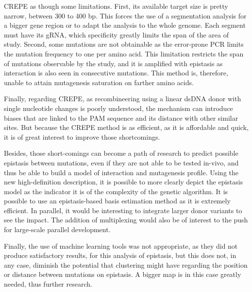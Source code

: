 \documentclass[12pt]{article}
\begin{document}
  CREPE as though some limitations. First, its available target size is pretty
  narrow, between 300 to 400 bp. This forces the use of a segmentation analysis
  for a bigger gene region or to adapt the analysis to the whole genome. Each
  segment must have its gRNA, which specificity greatly limits the span of the
  area of study. Second, some mutations are not obtainable as the error-prone PCR
  limits the mutation frequency to one per amino acid. This limitation restricts
  the span of mutations observable by the study, and it is amplified with
  epistasis as interaction is also seen in consecutive mutations. This method is,
  therefore, unable to attain mutagenesis saturation on farther amino acids. 

  Finally, regarding CREPE, as recombineering using a linear dsDNA donor with
  single nucleotide changes is poorly understood, the mechanism can introduce
  biases that are linked to the PAM sequence and its distance with other similar
  sites. But because the CREPE method is as efficient, as it is affordable and
  quick, it is of great interest to improve those shortcomings. 

  Besides, those short-comings can become a path of research to predict possible
  epistasis between mutations, even if they are not able to be tested in-vivo,
  and thus be able to build a model of interaction and mutagenesis profile. Using
  the new high-definition description, it is possible to more clearly depict the
  epistasis model as the indicator it is of the complexity of the genetic
  algorithm. It is possible to use an epistasis-based basis estimation method as
  it is extremely efficient. In parallel, it would be interesting to integrate
  larger donor variants to see the impact. The addition of multiplexing would
  also be of interest to the push for large-scale parallel development.  

  Finally, the use of machine learning tools was not appropriate, as they did not
  produce satisfactory results, for this analysis of epistasis, but this does
  not, in any case, diminish the potential that clustering might have regarding
  the position or distance between mutations on epistasis. A bigger map is in
  this case greatly needed, thus further research.


  \newpage

  
  
\end{document}
